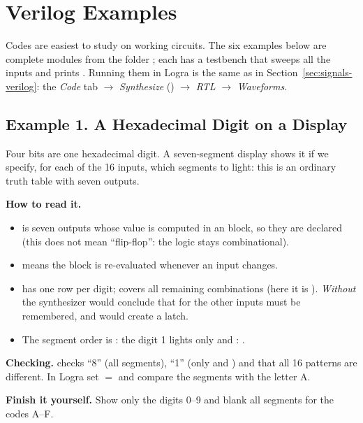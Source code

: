 \section{Verilog Examples}
\label{sec:codes-verilog}

Codes are easiest to study on working circuits. The six examples below are
complete modules from the folder ; each has a testbench
 that sweeps all the inputs and prints . Running them in
Logra is the same as in Section~\ref{sec:signals-verilog}: the \emph{Code} tab
$\to$ \emph{Synthesize} () $\to$ \emph{RTL} $\to$
\emph{Waveforms}.

\subsection{Example 1. A Hexadecimal Digit on a Display}

Four bits are one hexadecimal digit. A seven-segment display shows it if we
specify, for each of the 16 inputs, which segments to light: this is an
ordinary truth table with seven outputs.


\textbf{How to read it.}
\begin{itemize}
  \item {} is seven outputs whose value is computed in an  block, so they are declared  (this does not mean ``flip-flop'': the logic stays combinational).
  \item {} means the block is re-evaluated whenever an input changes.
  \item {} has one row per digit;  covers all remaining combinations (here it is ). \emph{Without}  the synthesizer would conclude that for the other inputs  must be remembered, and would create a latch.
  \item The segment order is : the digit 1 lights only  and : .
\end{itemize}
\textbf{Checking.}  checks ``8'' (all segments), ``1'' (only
 and ) and that all 16 patterns are different. In Logra set
 $=$  and compare the segments with the letter A.

\textbf{Finish it yourself.} Show only the digits 0--9 and blank all segments
for the codes A--F.

